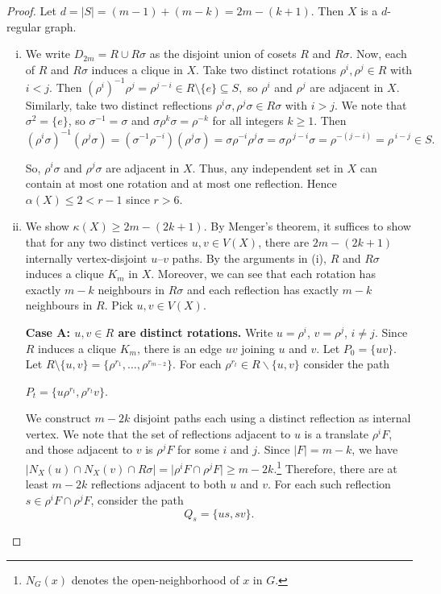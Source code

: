 \documentclass[10pt,a4paper]{amsart}
\begin{document}
\begin{proof}
Let $d=|S|=(m-1)+(m-k)=2m-(k+1)$. Then $X$ is a $d$-regular graph.

\begin{enumerate}[(i)]
    \item We write $D_{2m}=R\cup R\sigma$ as the disjoint union of cosets $R$ and $R\sigma$.
    Now, each of $R$ and $R\sigma$ induces a clique in $X$.
Take two distinct rotations \(\rho^i,\rho^j\in R\) with \(i< j\). Then
$
(\rho^i)^{-1}\rho^j=\rho^{j-i}\in R\setminus\{e\}\subseteq S,
$
so \(\rho^i\) and \(\rho^j\) are adjacent in $X$.
Similarly, take two distinct reflections \(\rho^i\sigma,\rho^j\sigma\in R\sigma\) with \(i> j\). 
We note that $\sigma^{2}=\{e\}$, so $\sigma^{-1}=\sigma$ and $\sigma\rho^{k}\sigma=\rho^{-k}$ for all integers $k\geq 1$.
Then
\[
(\rho^i\sigma)^{-1}(\rho^j\sigma)
= (\sigma^{-1}\rho^{-i})(\rho^j\sigma) 
= \sigma\rho^{-i}\rho^j\sigma
= \sigma\rho^{\,j-i}\sigma
= \rho^{-(j-i)}=\rho^{\,i-j}\in S.
\]

So, \(\rho^i\sigma\) and \(\rho^j\sigma\) are adjacent in $X$.
Thus, any independent set in $X$ can contain at most one rotation and at most one reflection. Hence $\alpha(X)\leq 2< r-1$ since $r> 6$.
    
\item We show $\kappa(X)\geq 2m-(2k+1)$. By Menger's theorem, it suffices to show that for any two distinct vertices
$u,v\in V(X)$, there are $2m-(2k+1)$ internally vertex-disjoint $u$--$v$ paths.
By the arguments in (i), $R$ and $R\sigma$ induces a clique $K_m$ in $X$. Moreover, we can see that each rotation has exactly $m-k$ neighbours in $R\sigma$ and each reflection has exactly $m-k$ neighbours in $R$.
Pick $u,v\in V(X)$.

\medskip\noindent\textbf{Case A: $u,v\in R$ are distinct rotations.}  
Write $u=\rho^i$, $v=\rho^j$, $i\ne j$. Since $R$ induces a clique $K_{m}$, there is an edge $uv$ joining $u$ and $v$. Let $P_{0}=\{uv\}$. 
Let $R\setminus\{u,v\}=\{\rho^{r_1},\dots,\rho^{r_{m-2}}\}$. For each $\rho^{r_t}\in R\backslash\{u,v\}$ consider the path
\begin{center}
$P_t= \{u\rho^{r_t}, \rho^{r_t}v\}$.    
\end{center}

We construct $m-2k$ disjoint paths each using a distinct reflection as internal vertex.
We note that the set of reflections
adjacent to $u$ is a translate $\rho^i F$, and those adjacent to $v$ is $\rho^j F$ for some $i$ and $j$. Since $|F|=m-k$, we have $\vert N_{X}(u)\cap N_{X}(v)\cap R\sigma\vert =\vert\rho^i F\cap \rho^j F\vert\geq m-2k$.\footnote{$N_{G}(x)$ denotes the open-neighborhood of $x$ in $G$.}
Therefore, there are at least $m-2k$ reflections adjacent to both $u$ and $v$.
For each such reflection $s\in \rho^i F\cap\rho^j F$, consider the path
\[
Q_s= \{us, sv\}.
\]


\end{enumerate}
\end{proof}
\end{document}
